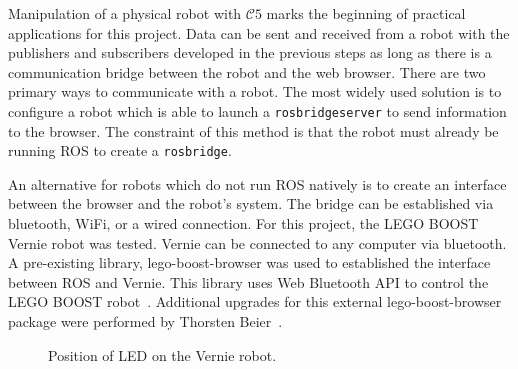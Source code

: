         Manipulation of a physical robot with $\mathcal{C}5$ marks the beginning of practical applications for this project. Data can be sent and received from a robot with the publishers and subscribers developed in the previous steps as long as there is a communication bridge between the robot and the web browser. There are two primary ways to communicate with a robot. The most widely used solution is to configure a robot which is able to launch a \texttt{rosbridge\smallunderscore  server} to send information to the browser. The constraint of this method is that the robot must already be running \ac{ROS} to create a \texttt{rosbridge}.

        An alternative for robots which do not run \ac{ROS} natively is to create an interface between the browser and the robot's system. The bridge can be established via bluetooth, WiFi, or a wired connection. For this project, the LEGO BOOST Vernie robot was tested. Vernie can be connected to any computer via bluetooth. A pre-existing library, \textsf{lego-boost-browser} was used to established the interface between \ac{ROS} and Vernie. This library uses Web Bluetooth \ac{API} to control the LEGO BOOST robot~\cite{boosted}.  Additional upgrades for this external \textsf{lego-boost-browser} package were performed by Thorsten Beier~\cite{thoboost}.

        
        \begin{figure}[htbp]
            \centering
    
            \caption{Position of \ac{LED} on the Vernie robot.}
            \label{fig:vernie}
        \end{figure}

